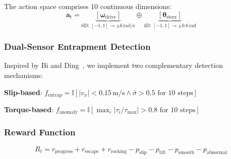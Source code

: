 \documentclass[12pt,a4paper]{article}
\begin{document}
The action space comprises 10 continuous dimensions:
\begin{equation}
\mathbf{a}_t = \underbrace{[\boldsymbol{\omega}_{\text{drive}}]}_{\text{6D: } [-1,1] \to \pm 6\,\text{rad/s}} \oplus \underbrace{[\boldsymbol{\theta}_{\text{steer}}]}_{\text{4D: } [-1,1] \to \pm 0.6\,\text{rad}}
\end{equation}


\subsubsection{Dual-Sensor Entrapment Detection}

Inspired by Bi and Ding~\cite{bi2026escape}, we implement two complementary detection mechanisms:

\textbf{Slip-based}: $f_{\text{entrap}} = \mathbb{I}\left[ |v_x| < 0.15\,\text{m/s} \wedge \bar{\sigma} > 0.5 \text{ for } 10\text{ steps} \right]$

\textbf{Torque-based}: $f_{\text{anomaly}} = \mathbb{I}\left[ \max_i |\tau_i/\tau_{\max}| > 0.8 \text{ for } 10\text{ steps} \right]$

\newpage
\subsubsection{Reward Function}

\begin{equation}
R_t = r_{\text{progress}} + r_{\text{escape}} + r_{\text{rocking}} - p_{\text{slip}} - p_{\text{tilt}} - p_{\text{smooth}} - p_{\text{abnormal}}
\end{equation}
\end{document}
